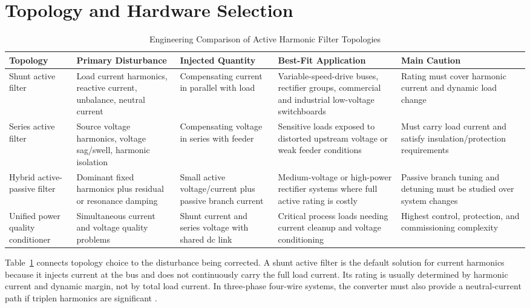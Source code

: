 \documentclass[conference]{IEEEtran}
\begin{document}
\section{Topology and Hardware Selection}
\begin{table}[!t]
\caption{Engineering Comparison of Active Harmonic Filter Topologies}
\label{tab:topologies}
\centering
\footnotesize
\setlength{\tabcolsep}{3pt}
\begin{tabular}{@{}p{}p{}p{}p{}p{}@{}}
\toprule
\textbf{Topology} & \textbf{Primary Disturbance} & \textbf{Injected Quantity} & \textbf{Best-Fit Application} & \textbf{Main Caution} \\
\midrule
Shunt active filter & Load current harmonics, reactive current, unbalance, neutral current & Compensating current in parallel with load & Variable-speed-drive buses, rectifier groups, commercial and industrial low-voltage switchboards & Rating must cover harmonic current and dynamic load change \\
Series active filter & Source voltage harmonics, voltage sag/swell, harmonic isolation & Compensating voltage in series with feeder & Sensitive loads exposed to distorted upstream voltage or weak feeder conditions & Must carry load current and satisfy insulation/protection requirements \\
Hybrid active-passive filter & Dominant fixed harmonics plus residual or resonance damping & Small active voltage/current plus passive branch current & Medium-voltage or high-power rectifier systems where full active rating is costly & Passive branch tuning and detuning must be studied over system changes \\
Unified power quality conditioner & Simultaneous current and voltage quality problems & Shunt current and series voltage with shared dc link & Critical process loads needing current cleanup and voltage conditioning & Highest control, protection, and commissioning complexity \\
\bottomrule
\end{tabular}
\end{table}

Table~\ref{tab:topologies} connects topology choice to the disturbance being corrected. A shunt active filter is the default solution for current harmonics because it injects current at the bus and does not continuously carry the full load current. Its rating is usually determined by harmonic current and dynamic margin, not by total load current. In three-phase four-wire systems, the converter must also provide a neutral-current path if triplen harmonics are significant \cite{Aredes1997,Montero2007}.
\end{document}
